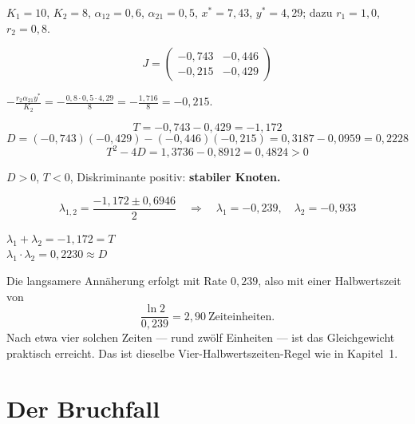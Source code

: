 \begin{merksatz}
$K_1=10$, $K_2=8$, $\alpha_{12}=0{,}6$, $\alpha_{21}=0{,}5$, $x^{*}=7{,}43$, $y^{*}=4{,}29$; dazu $r_1 = 1{,}0$, $r_2 = 0{,}8$.

\[ J = \begin{pmatrix} -0{,}743 & -0{,}446\\ -0{,}215 & -0{,}429 \end{pmatrix} \]

 $-\frac{r_2\alpha_{21}y^{*}}{K_2} = -\frac{0{,}8 \cdot 0{,}5 \cdot 4{,}29}{8} = -\frac{1{,}716}{8} = -0{,}215$.

\[ T = -0{,}743 - 0{,}429 = -1{,}172 \]
\[ D = (-0{,}743)(-0{,}429) - (-0{,}446)(-0{,}215) = 0{,}3187 - 0{,}0959 = 0{,}2228 \]
\[ T^2 - 4D = 1{,}3736 - 0{,}8912 = 0{,}4824 > 0 \]

$D>0$, $T<0$, Diskriminante positiv: \textbf{stabiler Knoten.}

\[ \lambda_{1,2} = \frac{-1{,}172 \pm 0{,}6946}{2} \quad\Longrightarrow\quad \lambda_1 = -0{,}239,\quad \lambda_2 = -0{,}933 \]

$\lambda_1 + \lambda_2 = -1{,}172 = T$ \checkmark\\
$\lambda_1 \cdot \lambda_2 = 0{,}2230 \approx D$ \checkmark

Die langsamere Annäherung erfolgt mit Rate $0{,}239$, also mit einer Halbwertszeit von
\[ \frac{\ln 2}{0{,}239} = 2{,}90 \ \text{Zeiteinheiten} . \]
Nach etwa vier solchen Zeiten --- rund zwölf Einheiten --- ist das Gleichgewicht praktisch erreicht. Das ist dieselbe Vier-Halbwertszeiten-Regel wie in Kapitel~1.
\end{merksatz}

\section{Der Bruchfall}

